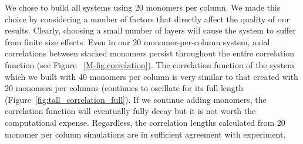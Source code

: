 \documentclass{article}
\begin{document}
  We chose to build all systems using 20 monomers per column. We made this choice
  by considering a number of factors that directly affect the quality of our results. 
  Clearly, choosing a small number of layers will cause the system to suffer from 
  finite size effects. Even in our 20 monomer-per-column system, axial correlations
  between stacked monomers persist throughout the entire correlation function (see
  Figure ~\ref{M-fig:correlation}). The correlation function of the system which we
  built with 40 monomers per column is very similar to that created with 20 monomers
  per columns (continues to oscillate for its full length
  (Figure~\ref{fig:tall_correlation_full}). If we continue adding monomers, the 
  correlation function will eventually fully decay but it is not worth the 
  computational expense. Regardless, the correlation lengths calculated from 20
  monomer per column simulations are in sufficient agreement with experiment. 
  
\end{document}
